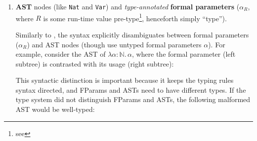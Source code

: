 \begin{enumerate}
\item \textbf{AST} nodes (like \texttt{Nat} and \texttt{Var}) and \textit{type-annotated} \textbf{formal parameters} ($\alpha_R$, where $R$ is some run-time value pre-type\footnote{see }, henceforth simply ``type'').

Similarly to \citet{calcagno-2003}, the syntax explicitly disambiguates between formal parameters ($\alpha_R$) and AST nodes (though \citeauthor{calcagno-2003} use untyped formal parameters $\alpha$). For example, consider the AST of $\lambda\alpha{}$${:}\mathbb{N}. \,\alpha$, where the formal parameter (left subtree) is contrasted with its usage (right subtree):

\begin{center}
\end{center}

This syntactic distinction is important because it keeps the typing rules syntax directed, and \textsf{FParam}s and \textsf{AST}s need to have different types. If the type system did not distinguish \textsf{FParam}s and \textsf{AST}s, the following malformed AST would be well-typed:
\begin{center}
\end{center}



\end{enumerate}
